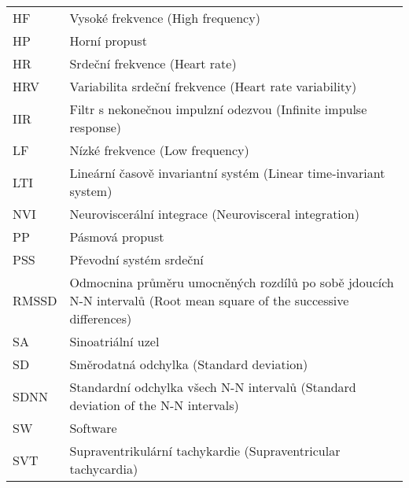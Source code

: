 \begin{table}[h]
\begin{center}
\begin{tabular}{p{2.5cm}p{12.25cm}}
			HF      & Vysoké frekvence (High frequency)                                                                                    \\
			HP      & Horní propust                                                                                                        \\
			HR      & Srdeční frekvence (Heart rate)                                                                                       \\
			HRV     & Variabilita srdeční frekvence (Heart rate variability)                                                               \\
			IIR     & Filtr s nekonečnou impulzní odezvou (Infinite impulse response)                                                      \\
			LF      & Nízké frekvence (Low frequency)                                                                                      \\
			LTI     & Lineární časově invariantní systém (Linear time-invariant system)                                                    \\
			NVI     & Neuroviscerální integrace (Neurovisceral integration)                                                                \\
			PP      & Pásmová propust                                                                                                      \\
			PSS     & Převodní systém srdeční                                                                                              \\
			RMSSD   & Odmocnina průměru umocněných rozdílů po sobě jdoucích N-N intervalů (Root mean square of the successive differences) \\
			SA      & Sinoatriální uzel                                                                                                    \\
			SD      & Směrodatná odchylka (Standard deviation)                                                                             \\
			SDNN    & Standardní odchylka všech N-N intervalů (Standard deviation of the N-N intervals)                                    \\
			SW      & Software                                                                                                             \\
			SVT     & Supraventrikulární tachykardie (Supraventricular tachycardia)                                                        \\

\end{tabular}
\end{center}
\end{table}
